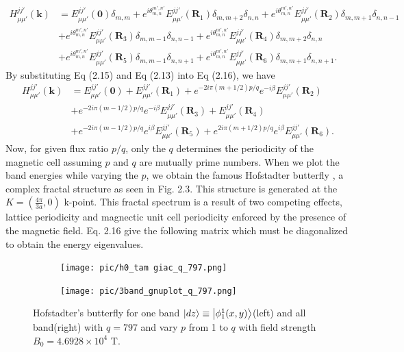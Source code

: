\documentclass{report}
\begin{document}
\begin{equation}
	\begin{aligned}
		H_{\mu\mu'}^{jj'}(\mathbf{k})
		 & = E_{\mu\mu'}^{jj'}(\mathbf{0})\delta_{m,m} + e^{i\theta_{m,n}^{m',n'}} E_{\mu\mu'}^{jj'}(\mathbf{R}_{1}) \delta_{m,m+2}\delta_{n,n} + e^{i\theta_{m,n}^{m',n'}} E_{\mu\mu'}^{jj'}(\mathbf{R}_{2}) \delta_{m,m+1} \delta_{n,n - 1} \\
		 & + e^{i\theta_{m,n}^{m',n'}} E_{\mu\mu'}^{jj'}(\mathbf{R}_{3}) \delta_{m,m - 1} \delta_{n,n - 1} + e^{i\theta_{m,n}^{m',n'}} E_{\mu\mu'}^{jj'}(\mathbf{R}_{4}) \delta_{m,m + 2} \delta_{n,n}                                        \\
		 & + e^{i\theta_{m,n}^{m',n'}} E_{\mu\mu'}^{jj'}(\mathbf{R}_{5}) \delta_{m,m - 1} \delta_{n,n + 1} + e^{i\theta_{m,n}^{m',n'}} E_{\mu\mu'}^{jj'}(\mathbf{R}_{6}) \delta_{m,m + 1} \delta_{n,n + 1}.
	\end{aligned}
\end{equation}
By substituting Eq (2.15) and Eq (2.13) into Eq (2.16), we have
\begin{equation}
	\begin{aligned}
		H_{\mu\mu'}^{jj'}(\mathbf{k})
		 & = E_{\mu\mu'}^{jj'}(\mathbf{0}) + E_{\mu\mu'}^{jj'}(\mathbf{R}_{1}) + e^{-2i\pi(m + 1/2)p / q} e^{-i\beta} E_{\mu\mu'}^{jj'}(\mathbf{R}_{2})    \\
		 & + e^{-2i\pi(m - 1/2)p / q} e^{-i\beta} E_{\mu\mu'}^{jj'}(\mathbf{R}_{3}) + E_{\mu\mu'}^{jj'}(\mathbf{R}_{4})                                    \\
		 & + e^{-2i\pi(m - 1/2)p / q} e^{i\beta} E_{\mu\mu'}^{jj'}(\mathbf{R}_{5}) + e^{2i\pi(m + 1/2)p / q} e^{i\beta} E_{\mu\mu'}^{jj'}(\mathbf{R}_{6}).
	\end{aligned}
\end{equation}
Now, for given flux ratio $p/q$, only the $q$ determines the periodicity of the magnetic cell assuming $p$ and $q$ are mutually prime numbers. When we plot the band energies while varying the $p$, we obtain the famous Hofstadter butterfly \cite{PhysRevB.14.2239}, a complex fractal structure as seen in Fig. 2.3. This structure is generated at the $K = (\frac{4\pi}{3a},0)$ k-point. This fractal spectrum is a result of two competing effects, lattice periodicity and magnectic unit cell periodicity enforced by the presence of the magnetic field. Eq. 2.16 give the following matrix which must be diagonalized to obtain the energy eigenvalues.
\begin{figure}[htb]
	\centering
	\begin{subfigure}[b]{0.495\textwidth}
		\centering
		\texttt{[image: pic/h0\_tam giac\_q\_797.png]}
		\label{fig:3 band}
	\end{subfigure}
	\begin{subfigure}[b]{0.495\textwidth}
		\centering
		\texttt{[image: pic/3band\_gnuplot\_q\_797.png]}
		\label{fig:1 band}
	\end{subfigure}
	\caption{
		Hofstadter’s butterfly for one band $\ket{dz} \equiv \ket{\phi_{1}^{1}(x,y)}$(left) and all band(right) with $q = 797$ and vary $p$  from 1 to $q$ with field strength $B_{0} = 4.6928 \times 10^{4}$ T.
	}
\end{figure}
\end{document}
